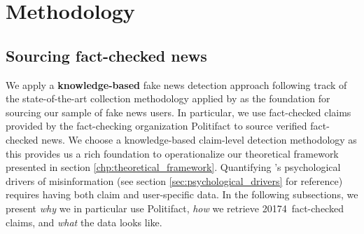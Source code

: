 \documentclass[
10pt, %
a4paper, %
oneside, %
headinclude,footinclude, %
] {book}%
\newcommand{\pltfctTOTAL}{20174}
\begin{document}
\clearpage


\chapter{Methodology}
\label{chp:methodology}

\section{Sourcing fact-checked news}
\label{sec:sourcing_fact_checked_news}

We apply a \textbf{knowledge-based} fake news detection approach following track of the state-of-the-art collection methodology applied by \cite{shu2018userprofiles, shu2020fakenewsnet} as the foundation for sourcing our sample of fake news users. In particular, we use fact-checked claims provided by the fact-checking organization Politifact to source verified fact-checked news. We choose a knowledge-based claim-level detection methodology as this provides us a rich foundation to operationalize our theoretical framework presented in section \ref{chp:theoretical_framework}. Quantifying \cite{psychological_drivers_misinformation}'s psychological drivers of misinformation (see section \ref{sec:psychological_drivers} for reference) requires having both claim and user-specific data. In the following subsections, we present \emph{why} we in particular use Politifact, \emph{how} we retrieve \pltfctTOTAL\ fact-checked claims, and \emph{what} the data looks like.
\end{document}
